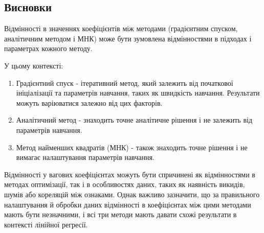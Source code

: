 \documentclass[]{article}
\begin{document}
\subsection{Висновки}\label{ux432ux438ux441ux43dux43eux432ux43aux438}

Відмінності в значеннях коефіцієнтів між методами (градієнтним спуском,
аналітичним методом і МНК) може бути зумовлена відмінностями в підходах
і параметрах кожного методу.

У цьому контексті:

\begin{enumerate}
	\def\labelenumi{\arabic{enumi}.}
	\item
	      Градієнтний спуск - ітеративний метод, який залежить від початкової
	      ініціалізації та параметрів навчання, таких як швидкість навчання.
	      Результати можуть варіюватися залежно від цих факторів.
	\item
	      Аналітичний метод - знаходить точне аналітичне рішення і не залежить
	      від параметрів навчання.
	\item
	      Метод найменших квадратів (МНК) - також знаходить точне рішення і не
	      вимагає налаштування параметрів навчання.
\end{enumerate}

Відмінності у вагових коефіцієнтах можуть бути спричинені як
відмінностями в методах оптимізації, так і в особливостях даних, таких
як наявність викидів, шумів або кореляцій між ознаками. Однак важливо
зазначити, що за правильного налаштування й обробки даних відмінності в
коефіцієнтах між цими методами мають бути незначними, і всі три методи
мають давати схожі результати в контексті лінійної регресії.




\end{document}
